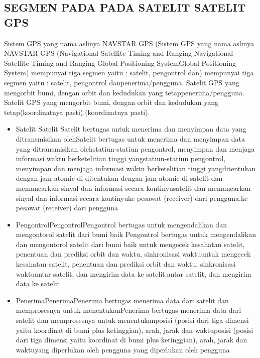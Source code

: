 \subsection{SEGMEN PADA PADA SATELIT SATELIT GPS}
Sistem GPS yang nama aslinya NAVSTAR GPS (Sistem GPS yang nama aslinya NAVSTAR GPS (Navigational Satellite Timing and Ranging Navigational Satellite Timing and Ranging Global Positioning SystemGlobal Positioning System) mempunyai tiga segmen yaitu : satelit, pengontrol dan) mempunyai tiga segmen yaitu : satelit, pengontrol danpenerima/pengguna. Satelit GPS yang mengorbit bumi, dengan orbit dan kedudukan yang tetappenerima/pengguna. Satelit GPS yang mengorbit bumi, dengan orbit dan kedudukan yang tetap(koordinatnya pasti).(koordinatnya pasti).
\begin{itemize}
	\item Satelit Satelit Satelit bertugas untuk menerima dan menyimpan data yang ditransmisikan olehSatelit bertugas untuk menerima dan menyimpan data yang ditransmisikan olehstatiun-statiun pengontrol, menyimpan dan menjaga informasi waktu berketelitian tinggi yangstatiun-statiun pengontrol, menyimpan dan menjaga informasi waktu berketelitian tinggi yangditentukan dengan jam atomic di ditentukan dengan jam atomic di satelit dan memancarkan sinyal dan informasi secara kontinyusatelit dan memancarkan sinyal dan informasi secara kontinyuke pesawat (receiver) dari pengguna.ke pesawat (receiver) dari pengguna
	\item PengontrolPengontrolPengontrol bertugas untuk mengendalikan dan mengontorol satelit dari bumi baik Pengontrol bertugas untuk mengendalikan dan mengontorol satelit dari bumi baik untuk mengecek kesahatan satelit, penentuan dan prediksi orbit dan waktu, sinkronisasi waktuuntuk mengecek kesahatan satelit, penentuan dan prediksi orbit dan waktu, sinkronisasi waktuantar satelit, dan mengirim data ke satelit.antar satelit, dan mengirim data ke satelit
	\item PenerimaPenerimaPenerima bertugas menerima data dari satelit dan memprosesnya untuk menentukanPenerima bertugas menerima data dari satelit dan memprosesnya untuk menentukanposisi (posisi dari tiga dimensi yaitu koordinat di bumi plus ketinggian), arah, jarak dan waktuposisi (posisi dari tiga dimensi yaitu koordinat di bumi plus ketinggian), arah, jarak dan waktuyang diperlukan oleh pengguna yang diperlukan oleh pengguna
\end{itemize}


